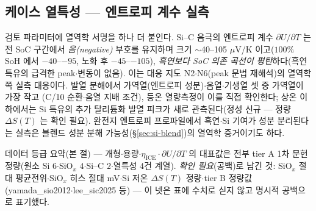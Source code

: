 \subsection{케이스 열특성 --- 엔트로피 계수 실측}\label{ssec:si-thermal}
검토 파라미터에 열역학 서명을 하나 더 붙인다. Si--C 음극의 엔트로피 계수 $\partial U/\partial T$ 는 전 SoC
구간에서 \emph{음(negative)} 부호를 유지하며 크기 $\sim$40--105 $\mu$V/K 이고($100\%$ SoH 에서
$-40$--$-95$, 노화 후 $-45$--$-105$), \emph{흑연보다 SoC 의존 곡선이 평탄}하다(흑연 특유의 급격한
peak$\cdot$변동이 없음)\cite{bohm_entropy2024}. 이는 대응 지도 N2$\cdot$N6(peak 문법 재해석)의 열역학
쪽 실측 대응이다. 발열 분해에서 가역열(엔트로피 성분)$\cdot$옴열$\cdot$기생열 셋 중 가역열이 가장 작고
(C/10 순환$\cdot$옴열 지배 조건), 등온 열량측정이
이를 직접 확인한다\cite{arnot_calorimetry2021}; 상온 이하에서는 Si 특유의 추가 탈리튬화 발열 피크가 새로
관측된다\cite{bohm_thermal2025}(정성 신규 --- 정량 $\Delta S(T)$ 는 확인 필요). 완전지 엔트로피
프로파일에서 흑연$\cdot$Si 기여가 성분 분리된다는 실측\cite{wojtala_entropy2022}은 블렌드 성분 분해
가능성(\S\ref{sec:si-blend})의 열역학 증거이기도 하다.
\begin{srcbox}
데이터 등급 요약(본 절) --- 개형$\cdot$용량$\cdot\eta_\mathrm{ICE}\cdot\partial U/\partial T$ 의 대표값은
전부 tier A 1차 문헌 정량(원소 Si $6$$\cdot$SiO$_x$ $4$$\cdot$Si--C $2$$\cdot$열특성 $4$건 계열). \emph{확인
필요}(공백)로 남긴 것: SiO$_x$ 절대 평균전위$\cdot$SiO$_x$ 히스 절대 mV$\cdot$Si 저온 $\Delta S(T)$
정량$\cdot$tier B 정량값(yamada\_sio2012$\cdot$lee\_sic2025 등) --- 이 넷은 표에 수치로 싣지 않고 명시적
공백으로 표기했다.
\end{srcbox}

